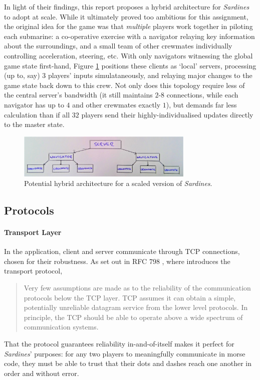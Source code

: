 \documentclass[a4paper, 9pt]{article}
\begin{document}
\begin{flushleft}
\vspace{5pt}\noindent
In light of their findings, this report proposes a hybrid architecture for \textit{Sardines} to adopt at scale. While it ultimately proved too ambitious for this assignment, the original idea for the game was that \textit{multiple} players work together in piloting each submarine: a co-operative exercise with a navigator relaying key information about the surroundings, and a small team of other crewmates individually controlling acceleration, steering, etc. With only navigators witnessing the global game state first-hand, Figure \ref{Hybrid Architecture} positions these clients as `local' servers, processing (up to, say) $3$ players' inputs simulataneously, and relaying major changes to the game state back down to this crew. Not only does this topology require less of the central server's bandwidth (it still maintains $2$-$8$ connections, while each navigator has up to $4$ and other crewmates exactly $1$),  but demands far less calculation than if all $32$ players send their highly-individualised updates directly to the master state.

\vspace{0pt}\noindent
\begin{figure}[h]
\centering
\includegraphics[width=0.75\textwidth]{Hybrid Architecture}
\caption{Potential hybrid architecture for a scaled version of \textit{Sardines}.}
\label{Hybrid Architecture}
\end{figure}

\subsection*{Protocols}

\paragraph{Transport Layer} In the application, client and server communicate through TCP connections, chosen for their robustness.
As set out in RFC 798 \citeyearpar{rfc793}, where \citeauthor{rfc793} introduces the transport protocol,  %
\begin{quote}
Very few assumptions are made as to the reliability of the communication protocols below the TCP layer.  TCP assumes it can obtain a simple, potentially unreliable datagram service from the lower level protocols.  In principle, the TCP should be able to operate above a wide spectrum of communication systems.
\end{quote}
That the protocol guarantees reliability in-and-of-itself makes it perfect for \textit{Sardines}' purposes: for any two players to meaningfully communicate in morse code, they must be able to trust that their dots and dashes reach one another in order and without error.


\end{flushleft}
\end{document}
